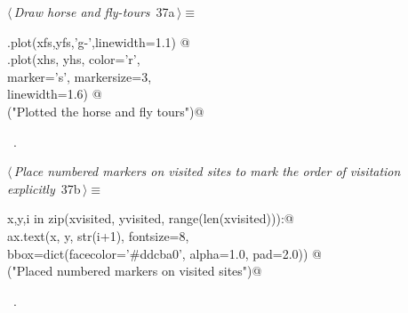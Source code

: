\documentclass[11.5pt]{report}
\begin{document}
\begin{flushleft} \small
\begin{minipage}{\linewidth}\label{scrap34}\raggedright\small
{} $\langle\,${\itshape Draw horse and fly-tours}\nobreak\ {\footnotesize {37a}}$\,\rangle\equiv$
\vspace{-1ex}
\begin{list}{}{} \item
\mbox{}\verb@ax.plot(xfs,yfs,'g-',linewidth=1.1)  @\\
\mbox{}\verb@ax.plot(xhs, yhs, color='r', \@\\
\mbox{}\verb@        marker='s', markersize=3, \@\\
\mbox{}\verb@        linewidth=1.6) @\\
\mbox{}\verb@debug("Plotted the horse and fly tours")@\\
\mbox{}\verb@@{\NWsep}
\end{list}
\vspace{-1.5ex}
\footnotesize
\begin{list}{}{\setlength{\itemsep}{-\parsep}\setlength{\itemindent}{-\leftmargin}}
\item \NWtxtMacroRefIn\ .

\item{}
\end{list}
\end{minipage}\vspace{4ex}
\end{flushleft}
\begin{flushleft} \small\label{scrap35}\raggedright\small
{} $\langle\,${\itshape Place numbered markers on visited sites to mark the order of visitation explicitly}\nobreak\ {\footnotesize {37b}}$\,\rangle\equiv$
\vspace{-1ex}
\begin{list}{}{} \item
\mbox{}\verb@for x,y,i in zip(xvisited, yvisited, range(len(xvisited))):@\\
\mbox{}\verb@     ax.text(x, y, str(i+1),  fontsize=8, \@\\
\mbox{}\verb@             bbox=dict(facecolor='#ddcba0', alpha=1.0, pad=2.0)) @\\
\mbox{}\verb@debug("Placed numbered markers on visited sites")@\\
\mbox{}\verb@@{\NWsep}
\end{list}
\vspace{-1.5ex}
\footnotesize
\begin{list}{}{\setlength{\itemsep}{-\parsep}\setlength{\itemindent}{-\leftmargin}}
\item \NWtxtMacroRefIn\ .

\item{}
\end{list}
\vspace{4ex}
\end{flushleft}
\end{document}
